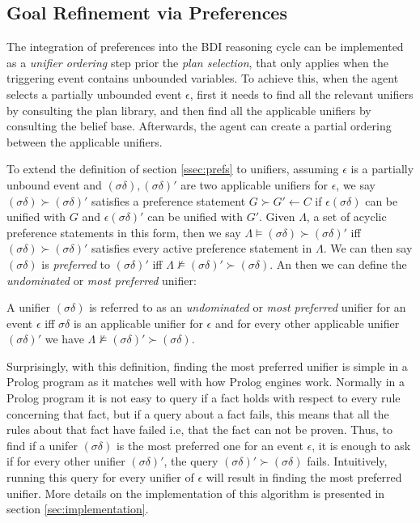 \subsection{Goal Refinement via Preferences}
\label{ssec:goalref}
The integration of preferences into the BDI reasoning cycle can be implemented as a \textit{unifier ordering} step prior the \textit{plan selection}, that only applies when the triggering event contains unbounded variables. To achieve this, when the agent selects a partially unbounded event $\epsilon$, first it needs to find all the relevant unifiers by consulting the plan library, and then find all the applicable unifiers by consulting the belief base. Afterwards, the agent can create a partial ordering between the applicable unifiers. 

To extend the definition of section \ref{ssec:prefs} to unifiers, assuming $\epsilon$ is a partially unbound event and $(\sigma\delta),(\sigma\delta)'$ are two applicable unifiers for $\epsilon$, we say $(\sigma\delta) \succ (\sigma\delta)'$ satisfies a preference statement $G \succ G' \leftarrow C$ if $\epsilon(\sigma\delta)$ can be unified with $G$ and $\epsilon(\sigma\delta)'$ can be unified with $G'$. Given  $\Lambda$, a set of acyclic preference statements in this form, then we say $\Lambda \models (\sigma\delta) \succ (\sigma\delta)'$ iff $(\sigma\delta) \succ (\sigma\delta)'$ satisfies every active preference statement in $\Lambda$. We can then say $(\sigma\delta)$ is \textit{preferred} to $(\sigma\delta)'$ iff $\Lambda \not\models (\sigma\delta)' \succ (\sigma\delta)$. An then we can define the \textit{undominated} or \textit{most preferred} unifier:

\begin{ddefinition}
\label{def:mpu}
A unifier $(\sigma\delta)$ is referred to as an \textit{undominated} or \textit{most preferred} unifier for an event $\epsilon$ iff $\sigma\delta$ is an applicable unifier for $\epsilon$ and for every other applicable unifier $(\sigma\delta)'$ we have $\Lambda \not\models (\sigma\delta)' \succ (\sigma\delta)$.
\end{ddefinition}

Surprisingly, with this definition, finding the most preferred unifier is simple in a Prolog program as it matches well with how Prolog engines work. Normally in a Prolog program it is not easy to query if a fact holds with respect to every rule concerning that fact, but if a query about a fact fails, this means that all the rules about that fact have failed i.e, that the fact can not be proven. Thus, to find if a unifer $(\sigma\delta)$ is the most preferred one for an event $\epsilon$, it is enough to ask if for every other unifier $(\sigma\delta)'$, the query $(\sigma\delta)' \succ (\sigma\delta)$ fails. Intuitively, running this query for every unifier of $\epsilon$ will result in finding the most preferred unifier. More details on the implementation of this algorithm is presented in section \ref{sec:implementation}.


